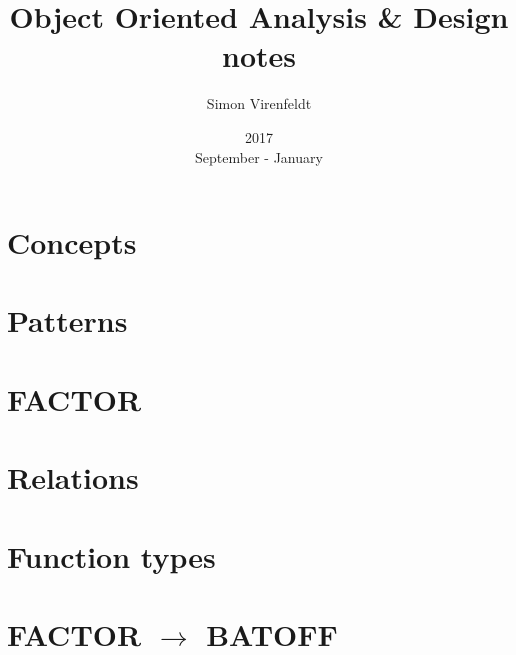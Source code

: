 \documentclass[10pt,a4paper,twocolumn]{article}
\author{Simon Virenfeldt}
\title{Object Oriented Analysis \& Design notes}
\date{2017\\September - January}
\begin{document}
    \maketitle
    \section{Concepts}
    
    
    \section{Patterns}
    
    
    \section{FACTOR}
    
    
    \section{Relations}
    
    
    \section{Function types}
    
    
    \section{FACTOR $\rightarrow$ BATOFF}
    
\end{document}
